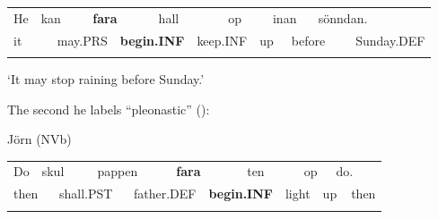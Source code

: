 \begin{tabular}{llllllllllllll}
\lsptoprule
He & \multicolumn{2}{l}{kan

} & \multicolumn{2}{l}{{\bfseries fara}

} & \multicolumn{2}{l}{hall

} & \multicolumn{2}{l}{op

} & \multicolumn{2}{l}{inan

} & \multicolumn{2}{l}{sönndan.

} & \\
\multicolumn{2}{l}{it

} & \multicolumn{2}{l}{may.PRS

} & \multicolumn{2}{l}{{\bfseries begin.INF}

} & \multicolumn{2}{l}{keep.INF

} & \multicolumn{2}{l}{up

} & \multicolumn{2}{l}{before

} & \multicolumn{2}{l}{Sunday.DEF

}\\
\lspbottomrule
\end{tabular}

\begin{styleTranslation}
 ‘It may stop raining before Sunday.’

\end{styleTranslation}

The second he labels “pleonastic” (\citet[21]{Holm1941}):

\begin{listWWNumileveli}
\item {}

\begin{styleExample}
Jörn (NVb)

\end{styleExample}

\end{listWWNumileveli}

\begin{tabular}{llllllllllllll}
\lsptoprule
Do & \multicolumn{2}{l}{skul

} & \multicolumn{2}{l}{pappen

} & \multicolumn{2}{l}{{\bfseries fara}

} & \multicolumn{2}{l}{ten

} & \multicolumn{2}{l}{op

} & \multicolumn{2}{l}{do.

} & \\
\multicolumn{2}{l}{then

} & \multicolumn{2}{l}{shall.PST

} & \multicolumn{2}{l}{father.DEF

} & \multicolumn{2}{l}{{\bfseries begin.INF}

} & \multicolumn{2}{l}{light

} & \multicolumn{2}{l}{up

} & \multicolumn{2}{l}{then

}\\
\lspbottomrule
\end{tabular}

